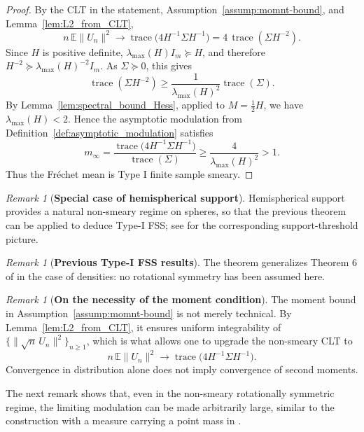 \documentclass{amsart}
\theoremstyle{definition}
\theoremstyle{remark}
\newtheorem{remark}[theorem]{Remark}
\newcommand\0{\boldsymbol{0}}
\begin{document}
\begin{proof}
By the CLT in the statement, Assumption~\ref{assump:momnt-bound}, and Lemma~\ref{lem:L2_from_CLT},
\[
    n\,\mathbb E\|U_n\|^2
    \longrightarrow
    \operatorname{trace}\bigl(4H^{-1}\Sigma H^{-1}\bigr)
    =
    4\,\operatorname{trace}(\Sigma H^{-2}).
\]
Since \(H\) is positive definite, \(\lambda_{\max}(H)I_m\succeq H\), and therefore \(H^{-2}\succeq \lambda_{\max}(H)^{-2}I_m\).  As \(\Sigma\succeq0\), this gives
\[
    \operatorname{trace}(\Sigma H^{-2})
    \ge
    \frac{1}{\lambda_{\max}(H)^2}\operatorname{trace}(\Sigma).
\]
By Lemma~\ref{lem:spectral_bound_Hess}, applied to \(M=\frac12H\), we have \(\lambda_{\max}(H)<2\).  Hence the asymptotic modulation from Definition~\ref{def:asymptotic_modulation} satisfies
\[
    m_\infty
    =
    \frac{\operatorname{trace}\bigl(4H^{-1}\Sigma H^{-1}\bigr)}
    {\operatorname{trace}(\Sigma)}
    \ge
    \frac{4}{\lambda_{\max}(H)^2}>1.
\]
Thus the Fr\'echet mean is Type I finite sample smeary.
\end{proof}

\begin{remark}[\textbf{Special case of hemispherical support}]\label{rmk:hemi-implies-FSS}
    Hemispherical support provides a natural non-smeary regime on spheres, so that the previous theorem can be applied to deduce Type-I FSS; see \citet{Pal2026SharpSupportThresholds} for the corresponding support-threshold picture. 
\end{remark}

\begin{remark}[\textbf{Previous Type-I FSS results}]
\label{rem:convex_closure_density}
  The theorem generalizes Theorem 6 of \citet{EltznerFSSonspheres} in the case of densities: no rotational symmetry has been assumed here.
\end{remark}

\begin{remark}[\textbf{On the necessity of the moment condition}]
\label{rem:moment_condition_importance}
The moment bound in Assumption~\ref{assump:momnt-bound} is not merely technical.  By Lemma~\ref{lem:L2_from_CLT}, it ensures uniform integrability of \(\{\|\sqrt n\,U_n\|^2\}_{n\ge1}\), which is what allows one to upgrade the non-smeary CLT to
\[
    n\,\mathbb E\|U_n\|^2
    \longrightarrow
    \operatorname{trace}\bigl(4H^{-1}\Sigma H^{-1}\bigr).
\]
Convergence in distribution alone does not imply convergence of second moments. 
\end{remark}

The next remark shows that, even in the non-smeary rotationally symmetric regime, the limiting modulation can be made arbitrarily large, similar to the construction with a measure carrying a point mass in \citet[Theorem~4.3]{Eltzner2022GeometricalSmeariness}.
\end{document}
